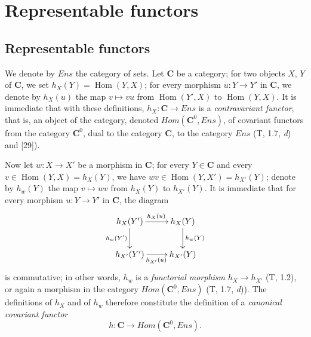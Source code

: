 \section{Representable functors}
\label{section:0.8}

\setcounter{subsection}{0}
\subsection{Representable functors}
\label{subsection:0.8.1}

\begin{env}[8.1.1]
\label{0.8.1.1}
We denote by $\boldsymbol{\mathit{Ens}}$ the category of sets. Let $\boldsymbol{C}$ be a
category; for two objects $X$, $Y$ of $\boldsymbol{C}$, we set
$h_X(Y)=\operatorname{Hom}(Y,X)$; for every morphism $u:Y\to Y'$ in $\boldsymbol{C}$,
we denote by $h_X(u)$ the map $v\mapsto vu$ from
$\operatorname{Hom}(Y',X)$ to $\operatorname{Hom}(Y,X)$. It is immediate
that with these definitions, $h_X:\boldsymbol{C}\to\boldsymbol{\mathit{Ens}}$ is a \emph{contravariant
functor}, that is, an object of the category, denoted
$\boldsymbol{\mathit{Hom}}(\boldsymbol{C}^0,\boldsymbol{\mathit{Ens}})$, of covariant functors from the
category $\boldsymbol{C}^0$, dual to the category $\boldsymbol{C}$, to the category
$\boldsymbol{\mathit{Ens}}$ (T, 1.7, \textit{d}) and [29]).
\end{env}

\begin{env}[8.1.2]
\label{0.8.1.2}
Now let $w:X\to X'$ be a morphism in $\boldsymbol{C}$; for every $Y\in\boldsymbol{C}$ and
every $v\in\operatorname{Hom}(Y,X)=h_X(Y)$, we have
$wv\in\operatorname{Hom}(Y,X')=h_{X'}(Y)$; denote by $h_w(Y)$
the map $v\mapsto wv$ from $h_X(Y)$ to $h_{X'}(Y)$. It is immediate
that for every morphism $u:Y\to Y'$ in $\boldsymbol{C}$, the diagram
\[
  \xymatrix{
    h_X(Y')\ar[r]^{h_X(u)}\ar[d]_{h_w(Y')} &
    h_X(Y)\ar[d]^{h_w(Y)}\\
    h_{X'}(Y')\ar[r]_{h_{X'}(u)} &
    h_{X'}(Y)
  }
\]
is commutative; in other words, $h_w$ is a \emph{functorial morphism}
$h_X\to h_{X'}$ (T, 1.2), or again a morphism in the category
$\boldsymbol{\mathit{Hom}}(\boldsymbol{C}^0,\boldsymbol{\mathit{Ens}})$ (T, 1.7, \textit{d})). The definitions of
$h_X$ and of $h_w$ therefore constitute the definition of a \emph{canonical
covariant functor}
\[
  h:\boldsymbol{C}\to\boldsymbol{\mathit{Hom}}(\boldsymbol{C}^0,\boldsymbol{\mathit{Ens}}).
  \tag{8.1.2.1}\label{0.8.1.2.1}
\]
\end{env}

